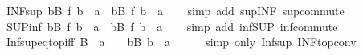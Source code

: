 \begin{isabellebody}
%
\endisadelimproof
\isanewline
{}\isamarkupfalse%
\ INF{\isacharunderscore}{\kern0pt}sup{\isacharcolon}{\kern0pt}\ {\isachardoublequoteopen}{\isacharparenleft}{\kern0pt}{\isasymSqinter}b{\isasymin}B{\isachardot}{\kern0pt}\ f\ b{\isacharparenright}{\kern0pt}\ {\isasymsqunion}\ a\ {\isacharequal}{\kern0pt}\ {\isacharparenleft}{\kern0pt}{\isasymSqinter}b{\isasymin}B{\isachardot}{\kern0pt}\ f\ b\ {\isasymsqunion}\ a{\isacharparenright}{\kern0pt}{\isachardoublequoteclose}\isanewline
%
\isadelimproof
\ \ %
\endisadelimproof
%
\isatagproof
{}\isamarkupfalse%
\ {\isacharparenleft}{\kern0pt}simp\ add{\isacharcolon}{\kern0pt}\ sup{\isacharunderscore}{\kern0pt}INF\ sup{\isacharunderscore}{\kern0pt}commute{\isacharparenright}{\kern0pt}%
\endisatagproof
{\isafoldproof}%
%
\isadelimproof
\isanewline
%
\endisadelimproof
\isanewline
{}\isamarkupfalse%
\ SUP{\isacharunderscore}{\kern0pt}inf{\isacharcolon}{\kern0pt}\ {\isachardoublequoteopen}{\isacharparenleft}{\kern0pt}{\isasymSqunion}b{\isasymin}B{\isachardot}{\kern0pt}\ f\ b{\isacharparenright}{\kern0pt}\ {\isasymsqinter}\ a\ {\isacharequal}{\kern0pt}\ {\isacharparenleft}{\kern0pt}{\isasymSqunion}b{\isasymin}B{\isachardot}{\kern0pt}\ f\ b\ {\isasymsqinter}\ a{\isacharparenright}{\kern0pt}{\isachardoublequoteclose}\isanewline
%
\isadelimproof
\ \ %
\endisadelimproof
%
\isatagproof
{}\isamarkupfalse%
\ {\isacharparenleft}{\kern0pt}simp\ add{\isacharcolon}{\kern0pt}\ inf{\isacharunderscore}{\kern0pt}SUP\ inf{\isacharunderscore}{\kern0pt}commute{\isacharparenright}{\kern0pt}%
\endisatagproof
{\isafoldproof}%
%
\isadelimproof
\isanewline
%
\endisadelimproof
\isanewline
{}\isamarkupfalse%
\ Inf{\isacharunderscore}{\kern0pt}sup{\isacharunderscore}{\kern0pt}eq{\isacharunderscore}{\kern0pt}top{\isacharunderscore}{\kern0pt}iff{\isacharcolon}{\kern0pt}\ {\isachardoublequoteopen}{\isacharparenleft}{\kern0pt}{\isasymSqinter}B\ {\isasymsqunion}\ a\ {\isacharequal}{\kern0pt}\ {\isasymtop}{\isacharparenright}{\kern0pt}\ {\isasymlongleftrightarrow}\ {\isacharparenleft}{\kern0pt}{\isasymforall}b{\isasymin}B{\isachardot}{\kern0pt}\ b\ {\isasymsqunion}\ a\ {\isacharequal}{\kern0pt}\ {\isasymtop}{\isacharparenright}{\kern0pt}{\isachardoublequoteclose}\isanewline
%
\isadelimproof
\ \ %
\endisadelimproof
%
\isatagproof
{}\isamarkupfalse%
\ {\isacharparenleft}{\kern0pt}simp\ only{\isacharcolon}{\kern0pt}\ Inf{\isacharunderscore}{\kern0pt}sup\ INF{\isacharunderscore}{\kern0pt}top{\isacharunderscore}{\kern0pt}conv{\isacharparenright}{\kern0pt}%
\endisatagproof

\end{isabellebody}
